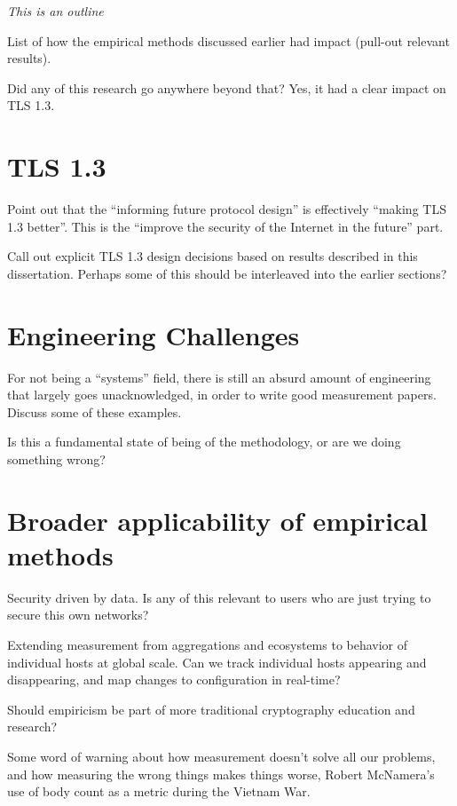 \textit{This is an outline}

List of how the empirical methods discussed earlier had impact
(pull-out relevant results).

Did any of this research go anywhere beyond that? Yes, it had a clear impact
on TLS 1.3.

\section{TLS 1.3}

Point out that the ``informing future protocol design'' is effectively
``making TLS 1.3 better''. This is the ``improve the security of the Internet
in the future'' part.

Call out explicit TLS 1.3 design decisions based on results described in this
dissertation. Perhaps some of this should be interleaved into the earlier
sections?

\section{Engineering Challenges}

For not being a ``systems'' field, there is still an absurd amount of
engineering that largely goes unacknowledged, in order to write good
measurement papers. Discuss some of these examples.

Is this a fundamental state of being of the methodology, or are we doing something wrong?

\section{Broader applicability of empirical methods}

Security driven by data. Is any of this relevant to users who are just trying
to secure this own networks?

Extending measurement from aggregations and ecosystems to behavior of
individual hosts at global scale. Can we track individual hosts appearing and
disappearing, and map changes to configuration in real-time?

Should empiricism be part of more traditional cryptography education and research?

Some word of warning about how measurement doesn't solve all our problems,
and how measuring the wrong things makes things worse, \eg Robert McNamera's
use of body count as a metric during the Vietnam War.



